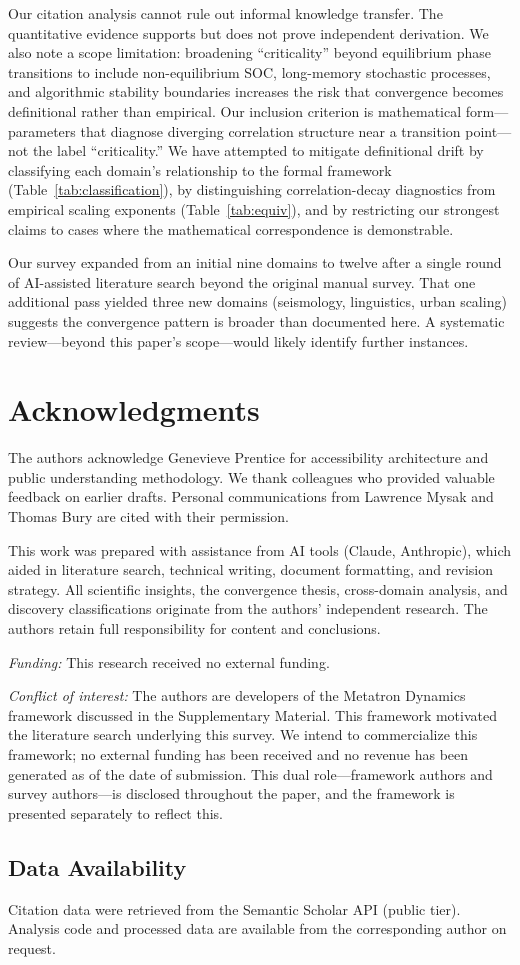 \documentclass[11pt]{article}
\begin{document}
Our citation analysis cannot rule out informal knowledge transfer. The quantitative evidence supports but does not prove independent derivation. We also note a scope limitation: broadening ``criticality'' beyond equilibrium phase transitions to include non-equilibrium SOC, long-memory stochastic processes, and algorithmic stability boundaries increases the risk that convergence becomes definitional rather than empirical. Our inclusion criterion is mathematical form---parameters that diagnose diverging correlation structure near a transition point---not the label ``criticality.'' We have attempted to mitigate definitional drift by classifying each domain's relationship to the formal framework (Table~\ref{tab:classification}), by distinguishing correlation-decay diagnostics from empirical scaling exponents (Table~\ref{tab:equiv}), and by restricting our strongest claims to cases where the mathematical correspondence is demonstrable.

Our survey expanded from an initial nine domains to twelve after a single round of AI-assisted literature search beyond the original manual survey. That one additional pass yielded three new domains (seismology, linguistics, urban scaling) suggests the convergence pattern is broader than documented here. A systematic review---beyond this paper's scope---would likely identify further instances.

\section*{Acknowledgments}

The authors acknowledge Genevieve Prentice for accessibility architecture and public understanding methodology. We thank colleagues who provided valuable feedback on earlier drafts. Personal communications from Lawrence Mysak and Thomas Bury are cited with their permission.

This work was prepared with assistance from AI tools (Claude, Anthropic), which aided in literature search, technical writing, document formatting, and revision strategy. All scientific insights, the convergence thesis, cross-domain analysis, and discovery classifications originate from the authors' independent research. The authors retain full responsibility for content and conclusions.

\textit{Funding:} This research received no external funding.

\textit{Conflict of interest:} The authors are developers of the Metatron Dynamics framework discussed in the Supplementary Material. This framework motivated the literature search underlying this survey. We intend to commercialize this framework; no external funding has been received and no revenue has been generated as of the date of submission. This dual role---framework authors and survey authors---is disclosed throughout the paper, and the framework is presented separately to reflect this.

\subsection*{Data Availability}

Citation data were retrieved from the Semantic Scholar API (public tier). Analysis code and processed data are available from the corresponding author on request.



\end{document}
